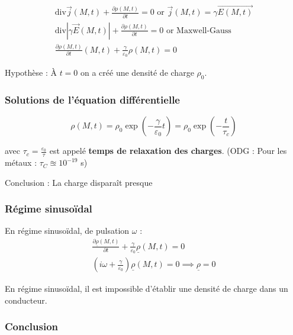 \begin{gather}
  \mathrm{div} \overrightarrow{j}(M,t) + \frac{\partial \rho(M,t)}{\partial t}  = 0 \text{ or } \overrightarrow{j}(M,t) = \gamma \overrightarrow{E(M,t)} \\ 
  \mathrm{div} | \gamma \overrightarrow{E}(M,t) | + \frac{\partial \rho(M,t)}{\partial t}  = 0 \text{ or } \text{Maxwell-Gauss} \\ 
  \frac{\partial \rho(M,t)}{\partial t} (M,t) + \frac{\gamma}{\varepsilon_0}  \rho(M,t) = 0
\end{gather}

Hypothèse : À $t=0$ on a créé une densité de charge $\rho_0$. 

\subsubsection{Solutions de l'équation différentielle} %
\label{sec:Solutions de l'équation différentielle}
 \begin{equation}
   \rho(M,t) = \rho_0 \exp \left( - \frac{\gamma}{\varepsilon_0} t \right) = \rho_0 \exp \left( - \frac{t}{\tau_c}  \right)
 \end{equation}

 avec $\tau_c = \frac{\varepsilon_0}{\tau} $ est appelé \textbf{temps de relaxation des charges}. (ODG : Pour les métaux : $\tau_C \approxeq 10 ^{-19}$ s)

 Conclusion : La charge disparaît presque 

 \subsubsection{Régime sinusoïdal} %
 
En régime sinusoïdal, de pulsation $\omega$ : 
\begin{gather}
  \frac{\partial \underline{\rho}(M,t)}{\partial t} + \frac{
  \gamma
  }{\varepsilon_0}  \underline{\rho}(M,t) = 0 \\ 
  \left( i \omega + \frac{\gamma}{\varepsilon_0}  \right) \underline{\rho}(M,t) = 0 \implies \underline{\rho} = 0
\end{gather}

En régime sinusoïdal, il est impossible d'établir une densité de charge dans un conducteur.

\subsubsection{Conclusion} %
\label{sec:Conclusion}

